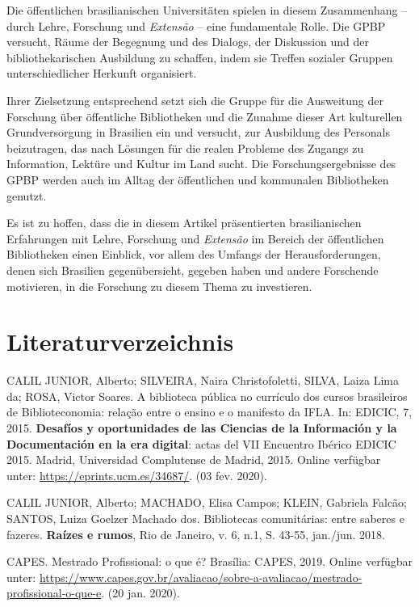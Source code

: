 \documentclass[a4paper,
fontsize=11pt,
oneside,
numbers=noperiodatend,
parskip=half-,
bibliography=totoc,
final
]{scrartcl}
\begin{document}
Die öffentlichen brasilianischen Universitäten spielen in diesem
Zusammenhang -- durch Lehre, Forschung und \emph{Extensão} -- eine
fundamentale Rolle. Die GPBP versucht, Räume der Begegnung und des
Dialogs, der Diskussion und der bibliothekarischen Ausbildung zu
schaffen, indem sie Treffen sozialer Gruppen unterschiedlicher Herkunft
organisiert.

Ihrer Zielsetzung entsprechend setzt sich die Gruppe für die Ausweitung
der Forschung über öffentliche Bibliotheken und die Zunahme dieser Art
kulturellen Grundversorgung in Brasilien ein und versucht, zur
Ausbildung des Personals beizutragen, das nach Lösungen für die realen
Probleme des Zugangs zu Information, Lektüre und Kultur im Land sucht.
Die Forschungsergebnisse des GPBP werden auch im Alltag der öffentlichen
und kommunalen Bibliotheken genutzt.

Es ist zu hoffen, dass die in diesem Artikel präsentierten
brasilianischen Erfahrungen mit Lehre, Forschung und \emph{Extensão} im
Bereich der öffentlichen Bibliotheken einen Einblick, vor allem des
Umfangs der Herausforderungen, denen sich Brasilien gegenübersieht,
gegeben haben und andere Forschende motivieren, in die Forschung zu
diesem Thema zu investieren.

\hypertarget{literaturverzeichnis}{%
\section{Literaturverzeichnis}\label{literaturverzeichnis}}

CALIL JUNIOR, Alberto; SILVEIRA, Naira Christofoletti, SILVA, Laiza Lima
da; ROSA, Victor Soares. A biblioteca pública no currículo dos cursos
brasileiros de Biblioteconomia: relação entre o ensino e o manifesto da
IFLA. In: EDICIC, 7, 2015. \textbf{Desafíos y oportunidades de las
Ciencias de la Información y la Documentación en la era digital}: actas
del VII Encuentro Ibérico EDICIC 2015. Madrid, Universidad Complutense
de Madrid, 2015. Online verfügbar unter:
\url{https://eprints.ucm.es/34687/}. (03 fev. 2020).

CALIL JUNIOR, Alberto; MACHADO, Elisa Campos; KLEIN, Gabriela Falcão;
SANTOS, Luiza Goelzer Machado dos. Bibliotecas comunitárias: entre
saberes e fazeres. \textbf{Raízes e rumos}, Rio de Janeiro, v. 6, n.1,
S. 43-55, jan./jun. 2018.

CAPES. Mestrado Profissional: o que é? Brasília: CAPES, 2019. Online
verfügbar unter:
\url{https://www.capes.gov.br/avaliacao/sobre-a-avaliacao/mestrado-profissional-o-que-e}.
(20 jan. 2020).
\end{document}
